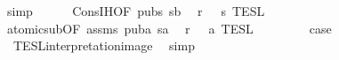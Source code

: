 \begin{isabellebody}
\ simp{\isacharplus}\isanewline
\ \ \ \ \isamarkupfalse%
\ Cons{\isachardot}IH{\isacharbrackleft}OF\ pubs\ sb{\isacharbrackright}\ \isamarkupfalse%
\ {\isacartoucheopen}r\ {\isasymin}\ {\isasymlbrakk}{\isasymlbrakk}\ s\ {\isasymrbrakk}{\isasymrbrakk}\isactrlsub T\isactrlsub E\isactrlsub S\isactrlsub L{\isacartoucheclose}\ \isacommand{{\isachardot}}\isamarkupfalse%
\isanewline
\ \ \ \ \isamarkupfalse%
\ \isamarkupfalse%
\ atomic{\isacharunderscore}sub{\isacharbrackleft}OF\ assms{\isacharparenleft}{}{\isacharparenright}\ puba\ sa{\isacharbrackright}\ \isamarkupfalse%
\ {\isacartoucheopen}r\ {\isasymin}\ {\isasymlbrakk}\ a\ {\isasymrbrakk}\isactrlsub T\isactrlsub E\isactrlsub S\isactrlsub L{\isacartoucheclose}\ \isacommand{{\isachardot}}\isamarkupfalse%
\isanewline
\ \ \ \ \isamarkupfalse%
\ \isamarkupfalse%
\ {\isacharquery}case\ \isamarkupfalse%
\ \ TESL{\isacharunderscore}interpretation{\isacharunderscore}image\ \isamarkupfalse%
\ simp\isanewline
{}\isamarkupfalse%
%
\endisatagproof
{\isafoldproof}%
%
\isadelimproof
\isanewline
%
\endisadelimproof
%
\isadelimtheory
\isanewline
%
\endisadelimtheory
%
\isatagtheory
{}\isamarkupfalse%
%
\endisatagtheory
{\isafoldtheory}%
%
\isadelimtheory
%
\endisadelimtheory
%
\end{isabellebody}%
\endinput
